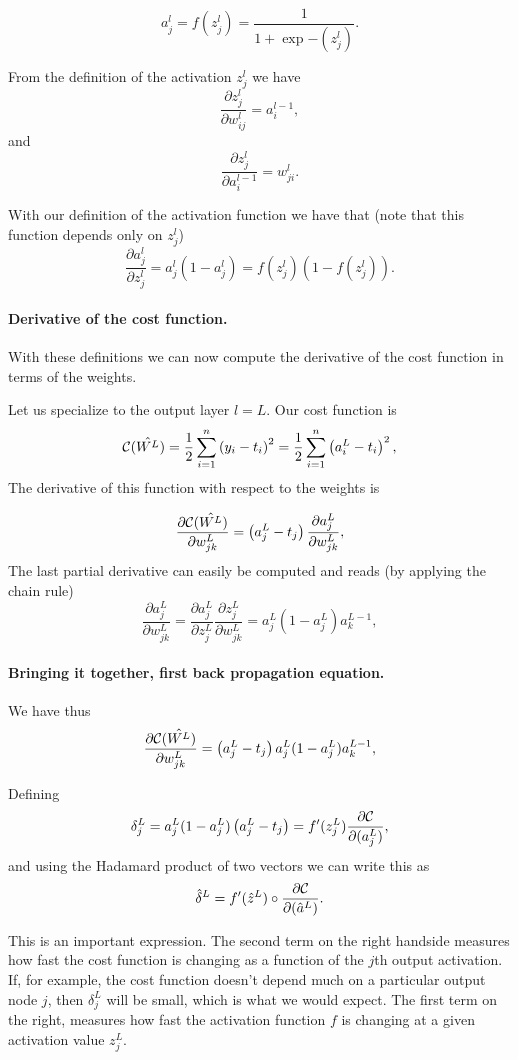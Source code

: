 \documentclass[%
oneside,                 %
final,                   %
10pt]{article}
\begin{document}
\[
a_j^l = f(z_j^l) = \frac{1}{1+\exp{-(z_j^l)}}.
\]


From the definition of the activation $z_j^l$ we have
\[
\frac{\partial z_j^l}{\partial w_{ij}^l} = a_i^{l-1},
\]
and
\[
\frac{\partial z_j^l}{\partial a_i^{l-1}} = w_{ji}^l. 
\]

With our definition of the activation function we have that (note that this function depends only on $z_j^l$)
\[
\frac{\partial a_j^l}{\partial z_j^{l}} = a_j^l(1-a_j^l)=f(z_j^l)(1-f(z_j^l)). 
\]



\paragraph{Derivative of the cost function.}
With these definitions we can now compute the derivative of the cost function in terms of the weights.

Let us specialize to the output layer $l=L$. Our cost function is
\[
{\cal C}(\hat{W^L})  =  \frac{1}{2}\sum_{i=1}^n\left(y_i - t_i\right)^2=\frac{1}{2}\sum_{i=1}^n\left(a_i^L - t_i\right)^2, 
\]
The derivative of this function with respect to the weights is

\[
\frac{\partial{\cal C}(\hat{W^L})}{\partial w_{jk}^L}  =  \left(a_j^L - t_j\right)\frac{\partial a_j^L}{\partial w_{jk}^{L}}, 
\]
The last partial derivative can easily be computed and reads (by applying the chain rule)
\[
\frac{\partial a_j^L}{\partial w_{jk}^{L}} = \frac{\partial a_j^L}{\partial z_{j}^{L}}\frac{\partial z_j^L}{\partial w_{jk}^{L}}=a_j^L(1-a_j^L)a_k^{L-1},  
\]



\paragraph{Bringing it together, first back propagation equation.}
We have thus
\[
\frac{\partial{\cal C}(\hat{W^L})}{\partial w_{jk}^L}  =  \left(a_j^L - t_j\right)a_j^L(1-a_j^L)a_k^{L-1}, 
\]

Defining
\[
\delta_j^L = a_j^L(1-a_j^L)\left(a_j^L - t_j\right) = f'(z_j^L)\frac{\partial {\cal C}}{\partial (a_j^L)},
\]
and using the Hadamard product of two vectors we can write this as
\[
\hat{\delta}^L = f'(\hat{z}^L)\circ\frac{\partial {\cal C}}{\partial (\hat{a}^L)}.
\]

This is an important expression. The second term on the right handside
measures how fast the cost function is changing as a function of the $j$th
output activation.  If, for example, the cost function doesn't depend
much on a particular output node $j$, then $\delta_j^L$ will be small,
which is what we would expect. The first term on the right, measures
how fast the activation function $f$ is changing at a given activation
value $z_j^L$.
\end{document}
